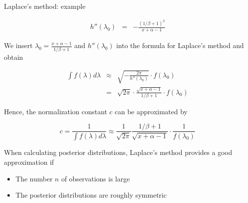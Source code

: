 \begin{vbframe}{Laplace's method: example}
\vspace*{-0.3cm}

\begin{eqnarray*}
h''(\lambda_0) &=& - \frac{(1 / \beta + 1)^2}{x + \alpha - 1}
\end{eqnarray*}

\framebreak

We insert $\lambda_0 = \frac{x + \alpha - 1}{1 / \beta + 1}$ and $h''(\lambda_0)$ into the formula for Laplace's method and obtain

\begin{eqnarray*}
\int f(\lambda) d\lambda &\approx& \sqrt{- \frac{2\pi}{h''(\lambda_0)}} \cdot f(\lambda_0) \\
&=& \sqrt{2 \pi} \cdot \frac{\sqrt{x + \alpha - 1}}{1 / \beta + 1}\cdot f(\lambda_0)
\end{eqnarray*}

Hence, the normalization constant $c$ can be approximated by

$$
c =\frac{1}{\int f(\lambda) d\lambda} \approx \frac{1}{\sqrt {2\pi}}\frac{1 / \beta + 1}{\sqrt{x + \alpha - 1}}\cdot \frac{1}{f(\lambda_0)}
$$








\framebreak

When calculating posterior distributions, Laplace's method provides a good approximation if

\begin{itemize}
\item The number $n$ of observations is large
\item The posterior distributions are roughly symmetric
\end{itemize}

\end{vbframe}


